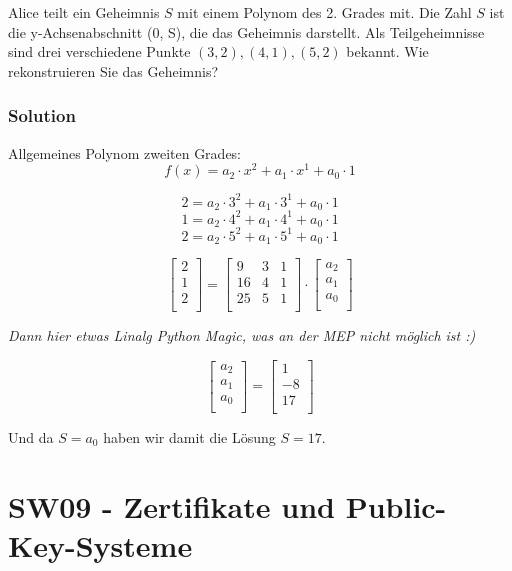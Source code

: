 \documentclass[11pt]{article}
\begin{document}
Alice teilt ein Geheimnis \(S\) mit einem Polynom des 2. Grades mit. Die
Zahl \(S\) ist die y-Achsenabschnitt (0, S), die das Geheimnis
darstellt. Als Teilgeheimnisse sind drei verschiedene Punkte
\((3, 2), (4, 1), (5, 2)\) bekannt. Wie rekonstruieren Sie das
Geheimnis?

\hypertarget{solution}{%
\subsubsection{Solution}\label{solution}}

Allgemeines Polynom zweiten Grades:
\[f(x) = a_2\cdot x^2 + a_1\cdot x^1 + a_0\cdot 1\]

\[ 2 = a_2\cdot 3^2 + a_1\cdot 3^1 + a_0\cdot 1\]
\[ 1 = a_2\cdot 4^2 + a_1\cdot 4^1 + a_0\cdot 1\]
\[ 2 = a_2\cdot 5^2 + a_1\cdot 5^1 + a_0\cdot 1\]

\[
\begin{bmatrix}
2\\
1\\
2\\
\end{bmatrix}
=
\begin{bmatrix}
9 & 3 & 1\\
16 & 4 & 1\\
25 & 5 & 1\\
\end{bmatrix}
\cdot
\begin{bmatrix}
a_2\\
a_1\\
a_0\\
\end{bmatrix}
\]

\emph{Dann hier etwas Linalg Python Magic, was an der MEP nicht möglich
ist :)}

\[
\begin{bmatrix}
a_2\\
a_1\\
a_0\\
\end{bmatrix}
=
\begin{bmatrix}
1\\
-8\\
17\\
\end{bmatrix}
\]

Und da \(S = a_0\) haben wir damit die Lösung \(S = 17\).

    

    \hypertarget{sw09---zertifikate-und-public-key-systeme}{%
\section{SW09 - Zertifikate und
Public-Key-Systeme}\label{sw09---zertifikate-und-public-key-systeme}}
\end{document}
